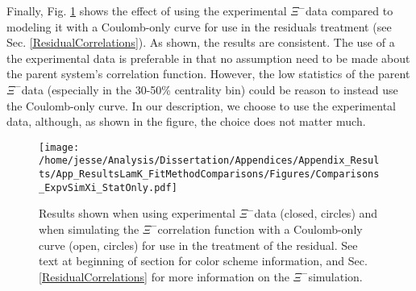 \documentclass[/home/jesse/Analysis/FemtoAnalysis/AnalysisNotes/AnalysisNoteJBuxton.tex]{subfiles}
\begin{document}
Finally, Fig. \ref{figApp:Comparisons_ExpvSimXi} shows the effect of using the experimental $\Xi^{-}$\Kpm data compared to modeling it with a Coulomb-only curve for use in the residuals treatment (see Sec. \ref{ResidualCorrelations}).
As shown, the results are consistent.
The use of a the experimental data is preferable in that no assumption need to be made about the parent system's correlation function.
However, the low statistics of the parent $\Xi^{-}$\Kpm data (especially in the 30-50\% centrality bin) could be reason to instead use the Coulomb-only curve.
In our description, we choose to use the experimental data, although, as shown in the figure, the choice does not matter much.

\begin{figure}[h]
  \centering
  \texttt{[image: /home/jesse/Analysis/Dissertation/Appendices/Appendix\_Results/App\_ResultsLamK\_FitMethodComparisons/Figures/Comparisons\_ExpvSimXi\_StatOnly.pdf]}
  \caption[Fit comparison: experimental vs simulated $\Xi^{-}$\Kpm]
  {
  Results shown when using experimental $\Xi^{-}$\Kpm data (closed, circles) and when simulating the $\Xi^{-}$\Kpm correlation function with a Coulomb-only curve (open, circles) for use in the treatment of the residual.  
  See text at beginning of section for color scheme information, and Sec. \ref{ResidualCorrelations} for more information on the $\Xi^{-}$\Kpm simulation.
  }
  \label{figApp:Comparisons_ExpvSimXi}
\end{figure}






\end{document}

